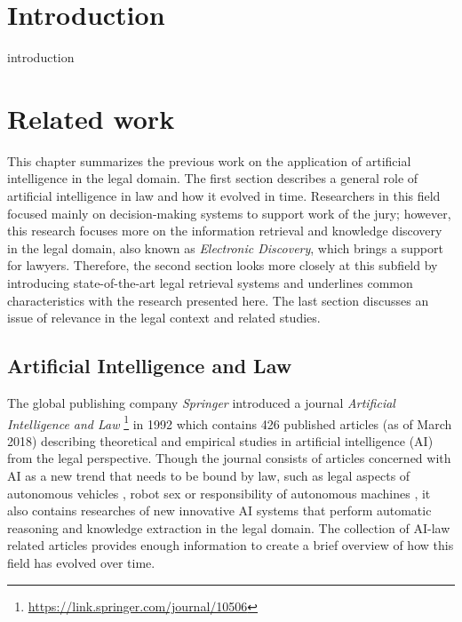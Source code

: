 \documentclass[
  digital, %
  table,   %
  lof,     %
  lot,     %
]{fithesis3}
\begin{document}
\chapter*{Introduction}

introduction

\chapter{Related work}
This chapter summarizes the previous work on the application of artificial intelligence in the legal domain. 
The first section describes a general role of artificial intelligence in law and how it evolved in time.
Researchers in this field focused mainly on decision-making systems to support work of the jury; however, this research focuses more on the information retrieval and knowledge discovery in the legal domain, also known as \textit{Electronic Discovery}, which brings a support for lawyers.
Therefore, the second section looks more closely at this subfield by introducing state-of-the-art legal retrieval systems and underlines common characteristics with the research presented here.
The last section discusses an issue of relevance in the legal context and related studies.

\section{Artificial Intelligence and Law}
The global publishing company \textit{Springer} introduced a journal \textit{Artificial Intelligence and Law} \footnote{\url{https://link.springer.com/journal/10506}} in 1992 which contains 426 published articles (as of March 2018) describing theoretical and empirical studies in artificial intelligence (AI) from the legal perspective.
Though the journal consists of articles concerned with AI as a new trend that needs to be bound by law, such as legal aspects of autonomous vehicles \cite{Prakken2017autonomous}, robot sex \cite{Frank2017robotSex} or responsibility of autonomous machines \cite{Brozek2017AIresponsibility}, it also contains researches of new innovative AI systems that perform automatic reasoning and knowledge extraction in the legal domain.
The collection of AI-law related articles provides enough information to create a brief overview of how this field has evolved over time.
\end{document}
